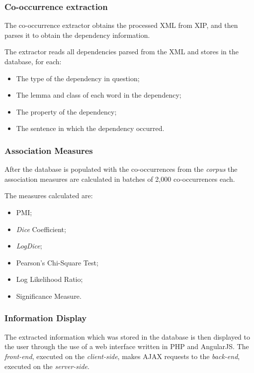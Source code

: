 \subsubsection*{Co-occurrence extraction}

The co-occurrence extractor obtains the processed XML from XIP, and then parses
it to obtain the dependency information.

The extractor reads all dependencies parsed from the XML and stores in the
database, for each:

\begin{itemize}
  \item The type of the dependency in question;
  \item The lemma and class of each word in the dependency;
  \item The property of the dependency;
  \item The sentence in which the dependency occurred.
\end{itemize}

\subsubsection*{Association Measures}
\label{sec:assoc}

After the database is populated with the co-occurrences from the \textit{corpus}
the association measures are calculated in batches of 2,000 co-occurrences
each.

The measures calculated are:

\begin{itemize}
  \item \ac{PMI};
  \item \textit{Dice} Coefficient;
  \item \textit{LogDice};
  \item Pearson's Chi-Square Test;
  \item Log Likelihood Ratio;
  \item Significance Measure.
\end{itemize}

\subsubsection*{Information Display}

The extracted information which was stored in the database is then displayed to
the user through the use of a web interface written in \ac{PHP} and AngularJS.
The \emph{front-end}, executed on the \emph{client-side}, makes \ac{AJAX}
requests to the \emph{back-end}, executed on the \emph{server-side}.

